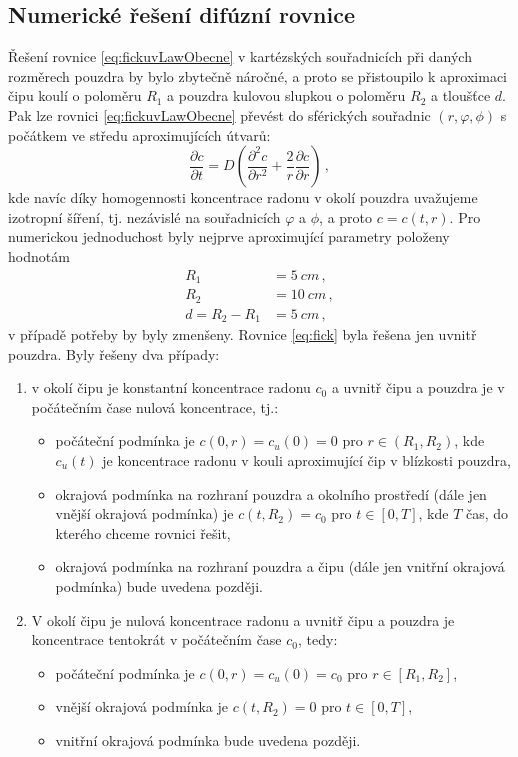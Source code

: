 \documentclass[11pt,a4paper]{article}
\begin{document}
\subsection{Numerické řešení difúzní rovnice}
Řešení rovnice \eqref{eq:fickuvLawObecne} v kartézských souřadnicích při daných rozměrech pouzdra by bylo zbytečně náročné, a proto se přistoupilo k aproximaci čipu koulí o poloměru $R_1$ a pouzdra kulovou slupkou o poloměru $R_2$ a tloušťce $d$. Pak lze rovnici \eqref{eq:fickuvLawObecne} převést do sférických souřadnic $(r, \varphi, \phi)$ s počátkem ve středu aproximujících útvarů:
\begin{equation}
\frac{\partial c}{\partial t}=D\left(\frac{\partial^2c}{\partial r^2}+\frac{2}{r}\frac{\partial c}{\partial r}\right)\,,\label{eq:fick}
\end{equation}
kde navíc díky homogennosti koncentrace radonu v okolí pouzdra uvažujeme izotropní šíření, tj. nezávislé na souřadnicích $\varphi$ a $\phi$, a proto $c=c(t,r)$. Pro numerickou jednoduchost byly nejprve aproximující parametry položeny hodnotám
\begin{align}
	R_1&=\SI{5}{cm}\,,\\
	R_2&=\SI{10}{cm}\,,\\
	d=R_2-R_1&=\SI{5}{cm}\,,
\end{align}
v případě potřeby by byly zmenšeny. Rovnice \eqref{eq:fick} byla řešena jen uvnitř pouzdra. Byly řešeny dva případy:
\begin{enumerate}
	\item v okolí čipu je konstantní koncentrace radonu $c_0$ a uvnitř čipu a pouzdra je v počátečním čase nulová koncentrace, tj.:
	\begin{itemize}
		\item počáteční podmínka je $c(0,r)=c_u(0)=0$ pro $r\in(R_1, R_2)$, kde $c_u(t)$ je koncentrace radonu v kouli aproximující čip v blízkosti pouzdra,
		\item okrajová podmínka na rozhraní pouzdra a okolního prostředí (dále jen vnější okrajová podmínka) je $c(t,R_2)=c_0$ pro $t\in[0,T]$, kde $T$ čas, do kterého chceme rovnici řešit,
		\item okrajová podmínka na rozhraní pouzdra a čipu (dále jen vnitřní okrajová podmínka) bude uvedena později.
	\end{itemize}
	 
	\item V okolí čipu je nulová koncentrace radonu a uvnitř čipu a pouzdra je koncentrace tentokrát v počátečním čase $c_0$, tedy:
	\begin{itemize}
		\item počáteční podmínka je $c(0,r)=c_u(0)=c_0$ pro $r\in[R_1, R_2]$,
		\item vnější okrajová podmínka je $c(t,R_2)=0$ pro $t\in[0,T]$,
		\item vnitřní okrajová podmínka bude uvedena později.
	\end{itemize} 
\end{enumerate}
\end{document}
